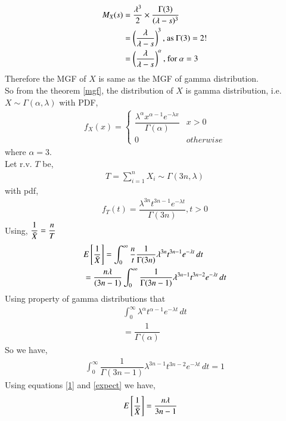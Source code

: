 \documentclass[journal,12pt,twocolumn]{IEEEtran}
\theoremstyle{definition}
\begin{document}
\begin{enumerate}
\begin{align}
    M_X(s) & = \dfrac{\lambda^3}{2} \times \dfrac{\Gamma(3)}{(\lambda- s)^3} \\
    &= \left(\dfrac{\lambda}{\lambda-s}\right)^3  \text{, as $\Gamma(3) = 2!$} \\
    &= \left(\dfrac{\lambda}{\lambda-s}\right)^\alpha  \text{, for $\alpha= 3$} 
\end{align}
Therefore the MGF of $ X $ is same as the MGF of gamma distribution. \\
So from the theorem \ref{mgf}, the distribution of $ X$ is gamma distribution, i.e. $ X \sim \Gamma(\alpha,\lambda)$ with PDF,
\begin{align}
f_{X}(x)  = 
\begin{cases}
\dfrac{\lambda^{\alpha}x^{\alpha-1}e^{-\lambda x}}{\Gamma(\alpha)} &  x > 0
\\
0 & otherwise
\end{cases}
\end{align}
where $ \alpha = 3 $. \\
Let r.v. $T $ be,
\begin{align}
    T = \sum_{i=1}^{n} X_i \sim \Gamma(3n, \lambda)
\end{align}
with pdf,
\begin{align}
    f_T(t)= \dfrac{\lambda^{3n} t^{3n-1}e^{-\lambda t}}{\Gamma(3n)} , t>0
\end{align}
Using, $ \dfrac{1}{\Bar{X}} = \dfrac{n}{T}$
\begin{align}
   & E \left[   \dfrac{1}{\Bar{X}}  \right] =  \int_{0}^{\infty} \dfrac{n}{t} \dfrac{1}{\Gamma(3n)} \lambda^{3n}t^{3n-1}e^{-\lambda t}\,dt \\
    &= \dfrac{n\lambda}{(3n-1)} \int_{0}^{\infty}  \dfrac{1}{\Gamma(3n-1)} \lambda^{3n-1}t^{3n-2}e^{-\lambda t}\,dt 
    \label{expect}
\end{align}
Using property of gamma distributions that
\begin{align}
    \int_{0}^{\infty}  \lambda^{\alpha}t^{\alpha-1}e^{-\lambda t}\,dt \\ 
    = \dfrac{1}{\Gamma(\alpha)}
\end{align}
So we have,
\begin{align}
    \int_{0}^{\infty}  \dfrac{1}{\Gamma(3n-1)} \lambda^{3n-1}t^{3n-2}e^{-\lambda t}\,dt = 1
    \label{1}
\end{align}
Using equations \eqref{1} and \eqref{expect} we have,
\begin{align}
    E \left[  \dfrac{1}{\Bar{X}}  \right] &= \dfrac{n\lambda}{3n-1}

\end{align}
\end{enumerate}
\end{document}
